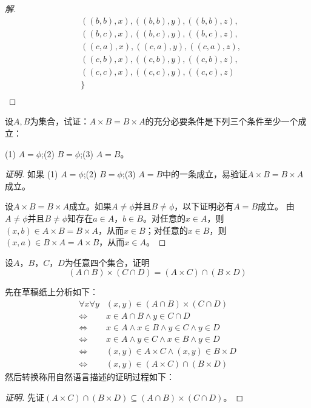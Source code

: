 \documentclass{article}
\begin{document}
\begin{CJK}{UTF8}{gbsn}
\begin{proof}[解]
\begin{align*}
        &((b,b),x), ((b,b), y), ((b,b), z), \\ 
        &((b,c), x), ((b,c), y), ((b, c), z), \\ 
        & ((c,a),x), ((c, a), y), ((c,a),z),\\ 
        &((c,b),x), ((c,b), y), ((c,b), z), \\ 
        &((c,c), x), ((c,c), y), ((c, c), z) \\
        &\}\\
  \end{align*}
\end{proof}
\begin{Exercise}
  设$A,B$为集合，试证：$A\times B= B\times A$的充分必要条件是下列三个条件至少一个成立：

  (1) $A=\phi$;(2) $B=\phi$;(3) $A=B$。
\end{Exercise}
\begin{proof}[证明]
  如果 (1) $A=\phi$;(2) $B=\phi$;(3) $A=B$中的一条成立，易验证$A\times B= B\times A$成立。

  设$A\times B= B\times A$成立。如果$A\neq \phi$并且$B\neq \phi$，以下证明必有$A=B$成立。
  由$A\neq \phi$并且$B\neq \phi$知存在$a\in A$，$b\in B$。对任意的$x\in A$，则$(x,b)\in A\times B = B\times A$，从而$x\in B$；对任意的$x\in B$，则$(x,a)\in B\times A = A\times B$，从而$x\in A$。
\end{proof}
\begin{Exercise}
  设$A$，$B$，$C$，$D$为任意四个集合，证明
  \[(A\cap B) \times (C \cap D) = (A\times C)\cap (B \times D)\]
\end{Exercise}
先在草稿纸上分析如下：
\begin{equation*}
  \begin{split}
  \forall x \forall y&(x,y) \in (A\cap B) \times (C \cap D)\\
  \Leftrightarrow&x \in A \cap B \land y \in C \cap D\\
  \Leftrightarrow&x \in A \land x \in B \land y \in C \land y \in D\\
  \Leftrightarrow&x \in A \land y \in C \land x \in B \land y \in D\\
  \Leftrightarrow&(x,y) \in A \times C \land (x,y) \in B \times D\\
  \Leftrightarrow&(x,y) \in (A\times C)\cap (B \times D)
  \end{split}
\end{equation*}
然后转换称用自然语言描述的证明过程如下：
\begin{proof}[证明]
  先证$(A\times C)\cap (B \times D)\subseteq (A\cap B) \times (C \cap D)$。


\end{proof}
\end{CJK}
\end{document}
